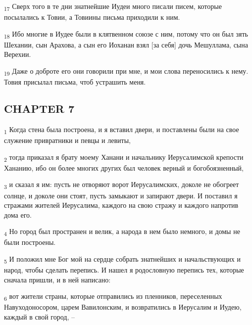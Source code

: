 \begin{tcolorbox}
\textsubscript{17} Сверх того в те дни знатнейшие Иудеи много писали писем, которые посылались к Товии, а Товиины письма приходили к ним.
\end{tcolorbox}
\begin{tcolorbox}
\textsubscript{18} Ибо многие в Иудее были в клятвенном союзе с ним, потому что он был зять Шехании, сын Арахова, а сын его Иоханан взял [за себя] дочь Мешуллама, сына Верехии.
\end{tcolorbox}
\begin{tcolorbox}
\textsubscript{19} Даже о доброте его они говорили при мне, и мои слова переносились к нему. Товия присылал письма, чтоб устрашить меня.
\end{tcolorbox}
\subsection{CHAPTER 7}
\begin{tcolorbox}
\textsubscript{1} Когда стена была построена, и я вставил двери, и поставлены были на свое служение привратники и певцы и левиты,
\end{tcolorbox}
\begin{tcolorbox}
\textsubscript{2} тогда приказал я брату моему Ханани и начальнику Иерусалимской крепости Хананию, ибо он более многих других был человек верный и богобоязненный,
\end{tcolorbox}
\begin{tcolorbox}
\textsubscript{3} и сказал я им: пусть не отворяют ворот Иерусалимских, доколе не обогреет солнце, и доколе они стоят, пусть замыкают и запирают двери. И поставил я стражами жителей Иерусалима, каждого на свою стражу и каждого напротив дома его.
\end{tcolorbox}
\begin{tcolorbox}
\textsubscript{4} Но город был пространен и велик, а народа в нем было немного, и домы не были построены.
\end{tcolorbox}
\begin{tcolorbox}
\textsubscript{5} И положил мне Бог мой на сердце собрать знатнейших и начальствующих и народ, чтобы сделать перепись. И нашел я родословную перепись тех, которые сначала пришли, и в ней написано:
\end{tcolorbox}
\begin{tcolorbox}
\textsubscript{6} вот жители страны, которые отправились из пленников, переселенных Навуходоносором, царем Вавилонским, и возвратились в Иерусалим и Иудею, каждый в свой город, --
\end{tcolorbox}
